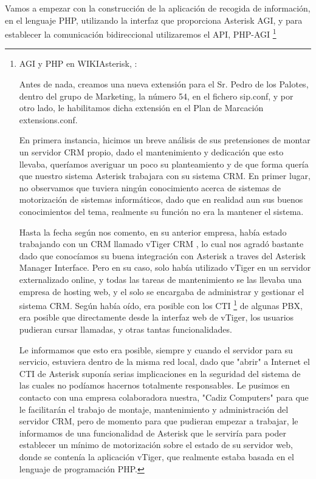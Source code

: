 Vamos a empezar con la construcción de la aplicación de recogida de información, en el lenguaje PHP, utilizando la interfaz que proporciona Asterisk AGI, y para establecer la comunicación bidireccional utilizaremos el API, PHP-AGI \footnote{AGI y PHP en WIKIAsterisk, :







Antes de nada, creamos una nueva extensión para el Sr. Pedro de los Palotes, dentro del grupo de Marketing, la número 54, en el fichero sip.conf, y por otro lado, le habilitamos dicha extensión en el Plan de Marcación extensions.conf.

En primera instancia, hicimos un breve análisis de sus pretensiones de montar un servidor CRM propio, dado el mantenimiento y dedicación que esto llevaba, queríamos averiguar un poco su planteamiento y de que forma quería que nuestro sistema Asterisk trabajara con su sistema CRM. En primer lugar, no observamos que tuviera ningún conocimiento acerca de sistemas de motorización de sistemas informáticos, dado que en realidad aun sus buenos conocimientos del tema, realmente su función no era la mantener el sistema. 

Hasta la fecha según nos comento, en su anterior empresa, había estado trabajando con un CRM llamado vTiger CRM \cite{website:vtiger}, lo cual nos agradó bastante dado que conocíamos su buena integración con Asterisk a traves del Asterisk Manager Interface. Pero en su caso, solo había utilizado vTiger en un servidor externalizado online, y todas las tareas de mantenimiento se las llevaba una empresa de hosting web, y el solo se encargaba de administrar y gestionar el sistema CRM. Según había oído, era posible con los CTI \footnote{CTI en Wikipedia, http://es.wikipedia.org/wiki/Computer\_Telephony\_Integration} de algunas PBX, era posible que directamente desde la interfaz web de vTiger, los usuarios pudieran cursar llamadas, y otras tantas funcionalidades.

Le informamos que esto era posible, siempre y cuando el servidor para su servicio, estuviera dentro de la misma red local, dado que "abrir" a Internet el CTI de Asterisk suponía serias implicaciones en la seguridad del sistema de las cuales no podíamos hacernos totalmente responsables. Le pusimos en contacto con una empresa colaboradora nuestra, "Cadiz Computers" para que le facilitarán el trabajo de montaje, mantenimiento y administración del servidor CRM, pero de momento para que pudieran empezar a trabajar, le informamos de una funcionalidad de Asterisk que le serviría para poder establecer un mínimo de motorización sobre el estado de su servidor web, donde se contenía la aplicación vTiger, que realmente estaba basada en el lenguaje de programación PHP.

}
